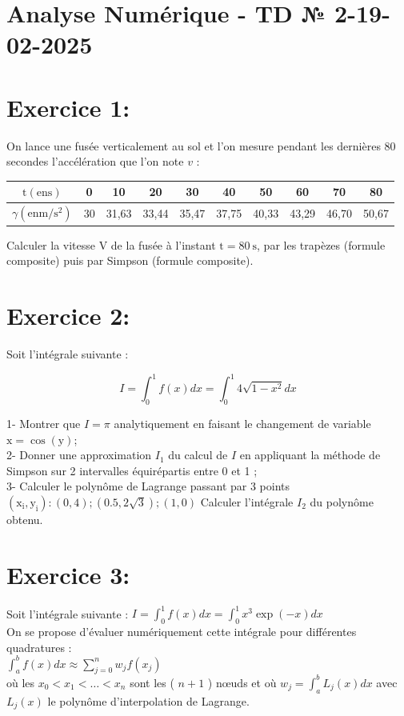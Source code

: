 \documentclass[10pt]{article}
\begin{document}
\section*{Analyse Numérique - TD № 2-19-02-2025}
\section*{Exercice 1:}
On lance une fusée verticalement au sol et l'on mesure pendant les dernières 80 secondes l'accélération que l'on note \(v\) :

\begin{center}
\begin{tabular}{|c|c|c|c|c|c|c|c|c|c|}
\hline
\(\mathrm{t}(\mathrm{en} \mathrm{s})\) & 0 & 10 & 20 & 30 & 40 & 50 & 60 & 70 & 80 \\
\hline
\(\gamma\left(\mathrm{en} \mathrm{m} / \mathrm{s}^{2}\right)\) & 30 & 31,63 & 33,44 & 35,47 & 37,75 & 40,33 & 43,29 & 46,70 & 50,67 \\
\hline
\end{tabular}
\end{center}

Calculer la vitesse V de la fusée à l'instant \(\mathrm{t}=80 \mathrm{~s}\), par les trapèzes (formule composite) puis par Simpson (formule composite).

\section*{Exercice 2:}
Soit l'intégrale suivante :

\[
I=\int_{0}^{1} f(x) d x=\int_{0}^{1} 4 \sqrt{1-x^{2}} d x
\]

1- Montrer que \(I=\pi\) analytiquement en faisant le changement de variable \(\mathrm{x}=\cos (\mathrm{y})\);\\
2- Donner une approximation \(I_{1}\) du calcul de \(I\) en appliquant la méthode de Simpson sur 2 intervalles équirépartis entre 0 et 1 ;\\
3- Calculer le polynôme de Lagrange passant par 3 points \(\left(\mathrm{x}_{\mathrm{i}}, \mathrm{y}_{\mathrm{i}}\right):(0,4) ;(0.5,2 \sqrt{3}) ;(1,0)\) Calculer l'intégrale \(I_{2}\) du polynôme obtenu.

\section*{Exercice 3:}
Soit l'intégrale suivante : \(I=\int_{0}^{1} f(x) d x=\int_{0}^{1} x^{3} \exp (-x) d x\)\\
On se propose d'évaluer numériquement cette intégrale pour différentes quadratures :\\
\(\int_{a}^{b} f(x) d x \approx \sum_{j=0}^{n} w_{j} f\left(x_{j}\right)\)\\
où les \(x_{0}<x_{1}<\ldots<x_{n}\) sont les ( \(n+1\) ) nœuds et où \(w_{j}=\int_{a}^{b} L_{j}(x) d x\) avec \(L_{j}(x)\) le polynôme d'interpolation de Lagrange.
\end{document}
